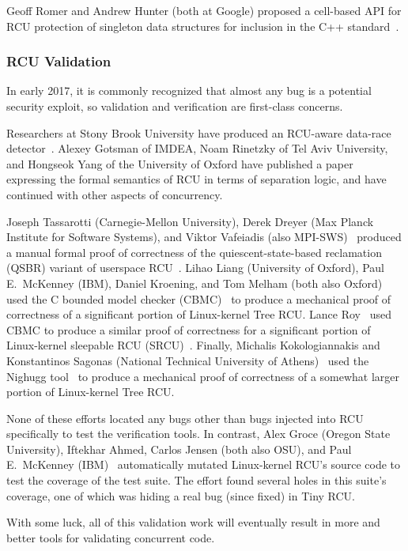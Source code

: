 Geoff Romer and Andrew Hunter (both at Google) proposed a cell-based API for RCU
protection of singleton data structures for inclusion in the
C++ standard~\cite{GeoffRomer2017C++DeferredReclamation}.

\subsubsection{RCU Validation}
\label{sec:defer:RCU Validation}

In early 2017, it is commonly recognized that almost any bug is a potential
security exploit, so validation and verification are first-class concerns.

Researchers at Stony Brook University have produced an RCU-aware data-race
detector~\cite{AbhinavDuggal2010Masters,JustinSeyster2012PhD,Seyster:2011:RFA:2075416.2075425}.
Alexey Gotsman of IMDEA, Noam Rinetzky of Tel Aviv University,
and Hongseok Yang of the University of Oxford have published a
paper~\cite{AlexeyGotsman2012VerifyGraceExtended} expressing the formal
semantics of RCU in terms of separation logic, and have continued with
other aspects of concurrency.

Joseph Tassarotti (Carnegie-Mellon University), Derek Dreyer (Max
Planck Institute for Software Systems), and Viktor Vafeiadis
(also MPI-SWS)~\cite{JosephTassarotti2015RCUproof}
produced a manual formal proof of correctness of the quiescent-state-based
reclamation (QSBR) variant of userspace
RCU~\cite{MathieuDesnoyers2009URCU,MathieuDesnoyers2012URCU}.
Lihao Liang (University of Oxford), Paul E.~McKenney (IBM),
Daniel Kroening, and Tom Melham
(both also Oxford)~\cite{LihaoLiang2016VerifyTreeRCU}
used the C bounded model checker (CBMC)~\cite{EdmundClarke2004CBMC}
to produce a mechanical proof of correctness of a significant portion
of Linux-kernel Tree RCU.
Lance Roy~\cite{LanceRoy2017CBMC-SRCU} used CBMC to produce a similar
proof of correctness for a significant portion of Linux-kernel
sleepable RCU (SRCU)~\cite{PaulEMcKenney2006c}.
Finally, Michalis Kokologiannakis and Konstantinos Sagonas (National Technical University of
Athens)~\cite{MichalisKokologiannakis2017NidhuggRCU}
used the Nighugg tool~\cite{CarlLeonardsson2014Nidhugg}
to produce a mechanical proof of correctness of a somewhat larger
portion of Linux-kernel Tree RCU.

None of these efforts located any bugs other than bugs injected into
RCU specifically to test the verification tools.
In contrast,
Alex Groce (Oregon State University), Iftekhar Ahmed, Carlos Jensen
(both also OSU), and Paul E.~McKenney
(IBM)~\cite{Groce:2015:VMC:2916135.2916190}
automatically mutated Linux-kernel RCU's source code to test the
coverage of the  test suite.
The effort found several holes in this suite's coverage, one of which
was hiding a real bug (since fixed) in Tiny RCU.

With some luck, all of this validation work will eventually result in
more and better tools for validating concurrent code.
